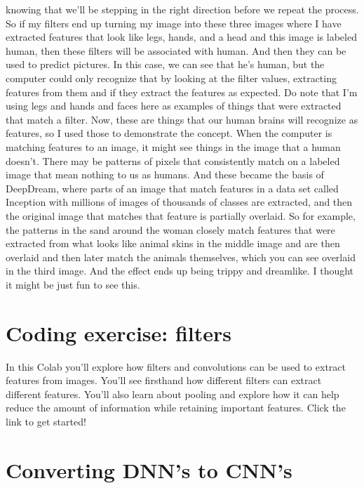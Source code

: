 knowing that we'll be stepping in the right direction
before we repeat the process.
So if my filters end up turning my image into these three images
where I have extracted features that look like legs,
hands, and a head and this image is labeled human,
then these filters will be associated with human.
And then they can be used to predict pictures.
In this case, we can see that he's human,
but the computer could only recognize that by looking at the filter values,
extracting features from them and if they extract the features as expected.
Do note that I'm using legs and hands and faces here
as examples of things that were extracted that match a filter.
Now, these are things that our human brains will recognize as features,
so I used those to demonstrate the concept.
When the computer is matching features to an image,
it might see things in the image that a human doesn't.
There may be patterns of pixels that consistently
match on a labeled image that mean nothing to us as humans.
And these became the basis of DeepDream, where
parts of an image that match features in a data set
called Inception with millions of images of thousands of classes are extracted,
and then the original image that matches that feature is partially overlaid.
So for example, the patterns in the sand around the woman
closely match features that were extracted
from what looks like animal skins in the middle image
and are then overlaid and then later match the animals themselves,
which you can see overlaid in the third image.
And the effect ends up being trippy and dreamlike.
I thought it might be just fun to see this.

\section{Coding exercise: filters}

In this Colab you’ll explore how filters and convolutions can be used to extract features from images. You’ll see firsthand how different filters can extract different features. You’ll also learn about pooling and explore how it can help reduce the amount of information while retaining important features. Click the link to get started!



\section{Converting DNN's to CNN's}

